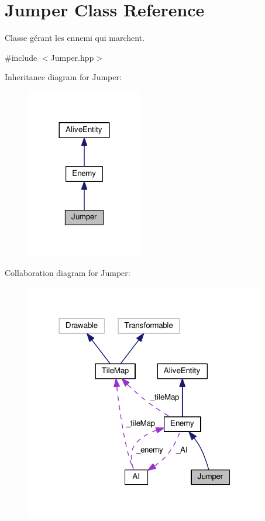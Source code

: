 \hypertarget{class_jumper}{\section{Jumper Class Reference}
\label{class_jumper}
}


Classe gérant les ennemi qui marchent.  




{\ttfamily \#include $<$Jumper.\+hpp$>$}



Inheritance diagram for Jumper\+:
\nopagebreak
\begin{figure}[H]
\begin{center}
\leavevmode
\includegraphics[width=144pt]{class_jumper__inherit__graph}
\end{center}
\end{figure}


Collaboration diagram for Jumper\+:
\nopagebreak
\begin{figure}[H]
\begin{center}
\leavevmode
\includegraphics[width=298pt]{class_jumper__coll__graph}
\end{center}
\end{figure}
